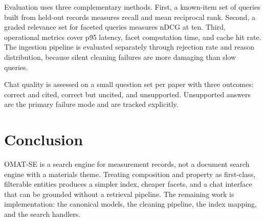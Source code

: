 \documentclass[11pt,a4paper]{article}
\begin{document}
Evaluation uses three complementary methods. First, a known-item set of queries
built from held-out records measures recall and mean reciprocal rank. Second, a
graded relevance set for faceted queries measures nDCG at ten. Third, operational
metrics cover p95 latency, facet computation time, and cache hit rate. The
ingestion pipeline is evaluated separately through rejection rate and reason
distribution, because silent cleaning failures are more damaging than slow
queries.

Chat quality is assessed on a small question set per paper with three outcomes:
correct and cited, correct but uncited, and unsupported. Unsupported answers are
the primary failure mode and are tracked explicitly.

\section{Conclusion}

OMAT-SE is a search engine for measurement records, not a document search engine
with a materials theme. Treating composition and property as first-class,
filterable entities produces a simpler index, cheaper facets, and a chat
interface that can be grounded without a retrieval pipeline. The remaining work
is implementation: the canonical models, the cleaning pipeline, the index
mapping, and the search handlers.



\end{document}
